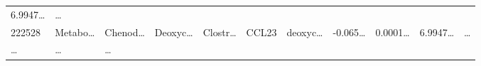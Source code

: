 \documentclass[
]{article}
\begin{document}
\begin{longtable}[]{@{}lllllllllll@{}}
\begin{minipage}[t]{0.07\columnwidth}
6.9947\ldots{}\strut
\end{minipage} & \begin{minipage}[t]{0.03\columnwidth}\raggedright
\ldots{}\strut
\end{minipage}\tabularnewline
\begin{minipage}[t]{0.05\columnwidth}\raggedright
222528\strut
\end{minipage} & \begin{minipage}[t]{0.07\columnwidth}\raggedright
Metabo\ldots{}\strut
\end{minipage} & \begin{minipage}[t]{0.07\columnwidth}\raggedright
Chenod\ldots{}\strut
\end{minipage} & \begin{minipage}[t]{0.09\columnwidth}\raggedright
Deoxyc\ldots{}\strut
\end{minipage} & \begin{minipage}[t]{0.07\columnwidth}\raggedright
Clostr\ldots{}\strut
\end{minipage} & \begin{minipage}[t]{0.07\columnwidth}\raggedright
CCL23\strut
\end{minipage} & \begin{minipage}[t]{0.09\columnwidth}\raggedright
deoxyc\ldots{}\strut
\end{minipage} & \begin{minipage}[t]{0.07\columnwidth}\raggedright
-0.065\ldots{}\strut
\end{minipage} & \begin{minipage}[t]{0.07\columnwidth}\raggedright
0.0001\ldots{}\strut
\end{minipage} & \begin{minipage}[t]{0.07\columnwidth}\raggedright
6.9947\ldots{}\strut
\end{minipage} & \begin{minipage}[t]{0.03\columnwidth}\raggedright
\ldots{}\strut
\end{minipage}\tabularnewline
\begin{minipage}[t]{0.05\columnwidth}\raggedright
\ldots{}\strut
\end{minipage} & \begin{minipage}[t]{0.07\columnwidth}\raggedright
\ldots{}\strut
\end{minipage} & \begin{minipage}[t]{0.07\columnwidth}\raggedright
\ldots{}\strut
\end{minipage} & \begin{minipage}[t]{0.09\columnwidth}\raggedright

\end{minipage}
\end{longtable}
\end{document}
